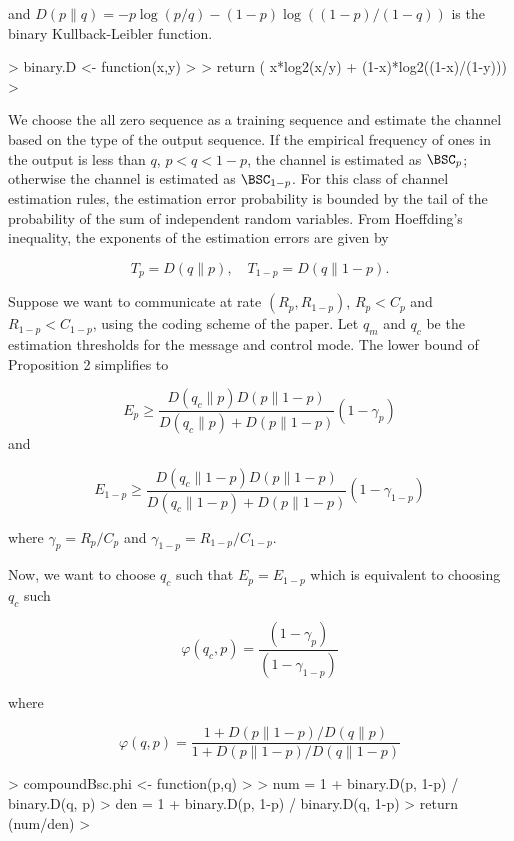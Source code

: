 and
$D(p\|q) = -p \log (p/q) - (1-p) \log ( (1-p)/(1-q))$ is the binary
Kullback-Leibler function.

\begin{Schunk}
\begin{Sinput}
> binary.D <- function(x,y)
> {
>   return ( x*log2(x/y) + (1-x)*log2((1-x)/(1-y)))
> }
\end{Sinput}
\end{Schunk}

We choose the all zero sequence as a training sequence and estimate the channel
based on the type of the output sequence. If the empirical frequency of ones in
the output is less than $q$, $p < q < 1-p$, the channel is estimated as
$\BSC_p$; otherwise the channel is estimated as $\BSC_{1-p}$. For this class of
channel estimation rules, the estimation error probability is bounded by the
tail of the probability of the sum of independent random variables. 
From Hoeffding's inequality, the exponents of
the estimation errors are given by

$$T_p = D(q \| p), \quad T_{1-p} = D(q \| 1-p).$$


Suppose we want to communicate at rate $(R_p, R_{1-p})$, $R_p < C_p$
and $R_{1-p} < C_{1-p}$, using the coding scheme of the paper.
Let $q_m$ and $q_c$ be the estimation thresholds for the message and control
mode. 
The lower bound of Proposition 2 simplifies to

$$E_p ≥ \frac{D(q_c \| p)   D(p \| 1-p)}
            {D(q_c\|p) + D(p \| 1-p)} 
            (1-γ_p)                         $$
and

$$E_{1-p} ≥ \frac{D(q_c \| 1-p) D(p \| 1-p)}
               {D(q_c\|1-p) + D(p \| 1-p)} 
                (1-γ_{1-p})                 $$

where $γ_p = R_p/C_p$ and $γ_{1-p} = R_{1-p}/C_{1-p}$. 

Now, we want to choose $q_c$ such that $E_p = E_{1-p}$ which is equivalent to
choosing $q_c$ such 

$$φ(q_c,p) = \frac{ (1-γ_p) }{ (1-γ_{1-p}) } $$

where

$$φ(q,p) = \frac{1 + D(p \| 1-p)/D(q\|p)}{1 + D(p \| 1-p)/D(q\|1-p) } $$

\begin{Schunk}
\begin{Sinput}
> compoundBsc.phi <- function(p,q)
> {
>   num = 1 + binary.D(p, 1-p) / binary.D(q, p)
>   den = 1 + binary.D(p, 1-p) / binary.D(q, 1-p)
>   return (num/den)
> }
\end{Sinput}
\end{Schunk}

